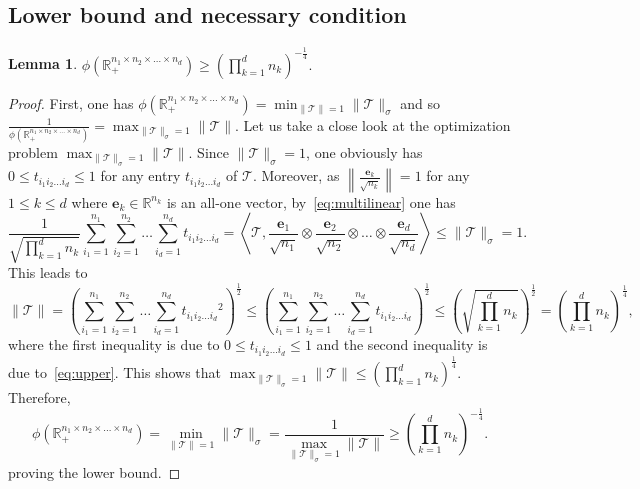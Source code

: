 \documentclass[11pt]{article}
\newtheorem{lemma}[theorem]{Lemma}
\newcommand{\R}{\mathbb{R}}
\newcommand{\TT}{\mathcal{T}}
\newcommand{\be}{\boldsymbol{e}}
\newcommand{\st}{\textnormal{s.t.}}
\begin{document}
\subsection{Lower bound and necessary condition} \label{sec:lower}

\begin{lemma}
$
\phi(\R_+^{n_1\times n_2\times \dots\times n_d})\ge \left(\prod_{k=1}^dn_k\right)^{-\frac{1}{4}}.
$
\end{lemma}
\begin{proof}
First, one has $\phi(\R_+^{n_1\times n_2\times \dots\times n_d})=\min_{\|\TT\|=1}\|\TT\|_\sigma$ and so $\frac{1}{\phi(\R_+^{n_1\times n_2\times \dots\times n_d})}=\max_{\|\TT\|_\sigma=1}\|\TT\|$. Let us take a close look at the optimization problem $\max_{\|\TT\|_\sigma=1}\|\TT\|$. Since $\|\TT\|_\sigma=1$, one obviously has $0\le t_{i_1i_2\dots i_d}\le 1$ for any entry $t_{i_1i_2\dots i_d}$ of $\TT$. Moreover, as $\left\|\frac{\be_k}{\sqrt{n_k}}\right\|=1$ for any $1\le k\le d$ where $\be_k\in\R^{n_k}$ is an all-one vector, by~\eqref{eq:multilinear} one has
\begin{equation} \label{eq:upper}
    \frac{1}{\sqrt{\prod_{k=1}^dn_k}}\sum_{i_1=1}^{n_1}\sum_{i_2=1}^{n_2}\dots\sum_{i_d=1}^{n_d}t_{i_1i_2\dots i_d}
=\left\langle \TT, \frac{\be_1}{\sqrt{n_1}}\otimes \frac{\be_2}{\sqrt{n_2}}\otimes\dots\otimes\frac{\be_d}{\sqrt{n_d}}\right\rangle
\le \|\TT\|_\sigma=1.
\end{equation}
This leads to
$$
\|\TT\|
= \left(\sum_{i_1=1}^{n_1}\sum_{i_2=1}^{n_2}\dots\sum_{i_d=1}^{n_d}{t_{i_1i_2\dots i_d}}^2\right)^{\frac{1}{2}}
\le \left(\sum_{i_1=1}^{n_1}\sum_{i_2=1}^{n_2}\dots\sum_{i_d=1}^{n_d}t_{i_1i_2\dots i_d}\right)^{\frac{1}{2}}
\le \left(\sqrt{\prod_{k=1}^dn_k}\right)^{\frac{1}{2}}
= \left(\prod_{k=1}^dn_k\right)^{\frac{1}{4}},
$$
where the first inequality is due to $0\le t_{i_1i_2\dots i_d}\le 1$ and the second inequality is due to~\eqref{eq:upper}. This shows that
$\max_{\|\TT\|_\sigma=1}\|\TT\|\le \left(\prod_{k=1}^dn_k\right)^{\frac{1}{4}}$. Therefore,
$$
\phi(\R_+^{n_1\times n_2\times \dots\times n_d}) = \min_{\|\TT\|=1}\|\TT\|_\sigma = \frac{1}{\max_{\|\TT\|_\sigma=1}\|\TT\|} \ge \left(\prod_{k=1}^dn_k\right)^{-\frac{1}{4}}.
$$
proving the lower bound.
\end{proof}
\end{document}
